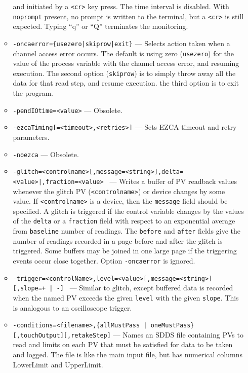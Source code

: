 \begin{itemize}
\begin{itemize}
                and initiated by a \verb+<cr>+ key press. The time interval is disabled. 
                With \verb+noprompt+ present, no prompt is written to the terminal, but a \verb+<cr>+
                is still expected. Typing ``q'' or ``Q'' terminates the monitoring.
        \item {\tt -oncaerror=\{usezero|skiprow|exit\}} --- Selects action taken when a channel access error occurs.
                The default is using zero ({\tt usezero}) for the value of the process variable 
                with the channel access error, and resuming execution. The second option ({\tt skiprow}) is to
                simply throw away all the data for that read step, and resume execution.
                the third option is to exit the program.
        \item {\tt -pendIOtime=<value>} --- Obsolete.
        \item {\tt -ezcaTiming[=<timeout>,<retries>]} --- Sets EZCA timeout and retry parameters.
        \item {\tt -noezca} --- Obsolete.
        \item {\tt -glitch=<controlname>[,message=<string>]{,delta=<value>|,fraction=<value>} \newline
[,before=<number>][,after=<number>][,baseline=<number>][,holdoff=<seconds>]} --- 
                Writes a buffer of PV readback values whenever the glitch PV (\verb+<controlname>+) or 
                   device changes by some value.  If \verb+<controlname>+ is a device, then the \verb+message+ field
                   should be specified. A glitch is triggered if the control 
                   variable changes by the values of the \verb+delta+ or a \verb+fraction+ field with respect to an exponential
                   average from \verb+baseline+ number of readings. 
                   The \verb+before+ and \verb+after+ fields give the number of readings recorded in a page
                   before and after the glitch is triggered. Some buffers may be joined in
                   one large page if the triggering events occur close together.
                   Option \verb+-oncaerror+ is ignored.
        \item {\tt -trigger=<controlName>,level=<value>[,message=<string>][,slope={+ | -}] \newline
                [,before=<number>][,after=<number>][,holdoff=<seconds>][,autoArm]} ---  
                  Similar to glitch, except buffered data is recorded when the named PV exceeds
                   the given \verb+level+ with the given \verb+slope+.  This is analogous to an oscilloscope
                   trigger.
        \item {\verb+-conditions=<filename>,{allMustPass | oneMustPass}[,touchOutput][,retakeStep]+} --- 
                   Names an SDDS file containing PVs to read and limits on each PV that must
                   be satisfied for data to be taken and logged.  The file is like the main
                   input file, but has numerical columns LowerLimit and UpperLimit.


\end{itemize}
\end{itemize}
